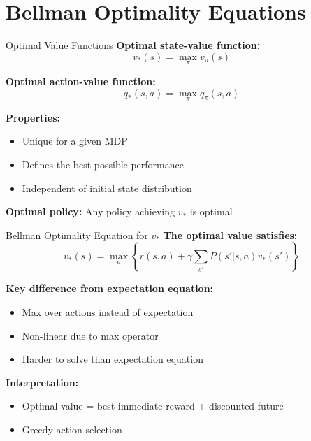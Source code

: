 \documentclass[aspectratio=169,10pt]{beamer}
\begin{document}
\section{Bellman Optimality Equations}

\begin{frame}{Optimal Value Functions}
\textbf{Optimal state-value function:}
\begin{equation}
v_*(s) = \max_\pi v_\pi(s)
\end{equation}

\textbf{Optimal action-value function:}
\begin{equation}
q_*(s,a) = \max_\pi q_\pi(s,a)
\end{equation}

\textbf{Properties:}
\begin{itemize}
    \item Unique for a given MDP
    \item Defines the best possible performance
    \item Independent of initial state distribution
\end{itemize}

\textbf{Optimal policy:} Any policy achieving $v_*$ is optimal
\end{frame}

\begin{frame}{Bellman Optimality Equation for $v_*$}
\textbf{The optimal value satisfies:}
\begin{equation}
v_*(s) = \max_a \left\{ r(s,a) + \gamma \sum_{s'} P(s'|s,a) v_*(s') \right\}
\end{equation}

\textbf{Key difference from expectation equation:}
\begin{itemize}
    \item Max over actions instead of expectation
    \item Non-linear due to max operator
    \item Harder to solve than expectation equation
\end{itemize}

\textbf{Interpretation:}
\begin{itemize}
    \item Optimal value = best immediate reward + discounted future
    \item Greedy action selection
\end{itemize}
\end{frame}
\end{document}
